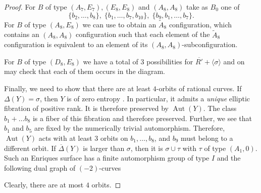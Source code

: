\documentclass[a4paper]{amsart}
\theoremstyle{definition}
\theoremstyle{plain}
\DeclareMathOperator{\Aut}{Aut}
\newcommand{\DeltabarY}{\overline{\Delta}(Y)}
\begin{document}
\begin{proof}
For $B$ of type $(A_7,E_7),(E_8,E_8)$ and $(A_8,A_8)$ take as $B_0$
one of 
\[\{b_2,\dots ,b_8\},\;\{b_1,\dots,b_7,b_{10}\},\;\{b_9,b_1,\dots,b_7\}.\]
For $B$ of type $(A_8,E_8)$ we can use  to obtain an $\widetilde{A}_8$ configuration, which contains an $(A_8,A_8)$ configuration such that each element of the $\widetilde{A}_8$ configuration is equivalent to an element of its $(A_8,A_8)$-subconfiguration.

For $B$ of type $(D_8,E_8)$ we have a total of $3$ possibilities for $\overline{R'}+\langle \sigma \rangle$ and on may check that each of them occurs in the diagram.

Finally, we need to show that there are at least $4$-orbits of rational curves. If $\Delta(Y)=\sigma$, then $Y$ is of zero entropy \cite{martin2024enriquessurfaceszeroentropy}. In particular, it admits a \emph{unique} elliptic fibration of positive rank. It is therefore preserved by $\Aut(Y)$. The class $b_1+\dots b_8$ is a fiber of this fibration and therefore preserved. Further, we see that $b_1$ and $b_5$ are fixed by the numerically trivial automorphism. Therefore, $\Aut(Y)$ acts with at least $3$ orbits on $b_1,\dots,b_8$, and $b_9$ must belong to a different orbit. 
If $\DeltabarY$ is larger than $\sigma$, then it is $\sigma \cup \tau$ with $\tau$ of type $(A_1,0)$. Such an Enriques surface has a finite automorphism group \cite[Theorem 8.9.3]{enriquesII} of type $I$ and the following dual graph of $(-2)$-curves \cite[Table 8.11]{enriquesII}
\begin{center}
\end{center}
Clearly, there are at most $4$ orbits.
\end{proof}




\end{document}
